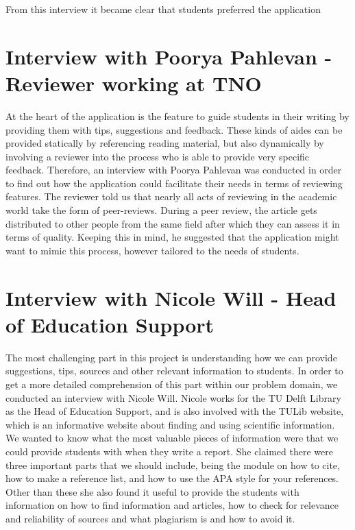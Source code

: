 From this interview it became clear that students preferred the application 

\section{Interview with Poorya Pahlevan - Reviewer working at TNO }
At the heart of the application is the feature to guide students in their writing by providing them with tips, suggestions and feedback. These kinds of aides can be provided statically by referencing reading material, but also dynamically by involving a reviewer into the process who is able to provide very specific feedback. Therefore, an interview with Poorya Pahlevan was conducted in order to find out how the application could facilitate their needs in terms of reviewing features. The reviewer told us that nearly all acts of reviewing in the academic world take the form of peer-reviews. During a peer review, the article gets distributed to other people from the same field after which they can assess it in terms of quality. Keeping this in mind, he suggested that the application might want to mimic this process, however tailored to the needs of students.


\section{Interview with Nicole Will - Head of Education Support}
 The most challenging part in this project is understanding how we can provide suggestions, tips, sources and other relevant information to students. In order to get a more detailed comprehension of this part within our problem domain, we conducted an interview with Nicole Will. Nicole works for the TU Delft Library as the Head of Education Support, and is also involved with the TULib website, which is an informative website about finding and using scientific information.
We wanted to know what the most valuable pieces of information were that we could provide students with when they write a report. She claimed there were three important parts that we should include, being the module on how to cite\cite{tulib:howtocite}, how to make a reference list, and how to use the APA\cite{tulib:apa} style for your references.
Other than these she also found it useful to provide the students with information on how to find information and articles, how to check for relevance and reliability of sources and what plagiarism is and how to avoid it.